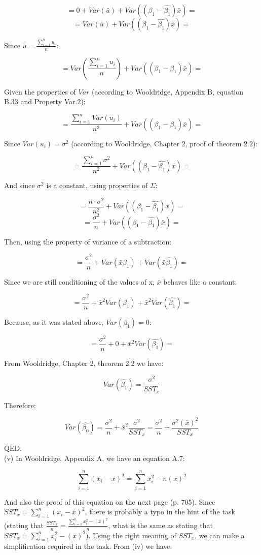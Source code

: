 \documentclass{article}
\begin{document}
$$= 0 + Var(\bar{u}) + Var((\beta_1 - \hat{\beta_1})\bar{x})=$$
$$= Var(\bar{u}) + Var((\beta_1 - \hat{\beta_1})\bar{x})=$$

Since $\bar{u} = \frac{\sum_{i=1}^{n} u_i}{n}$:

$$= Var(\frac{\sum_{i=1}^{n} u_i}{n}) + Var((\beta_1 - \hat{\beta_1})\bar{x})=$$

Given the properties of $Var$ (according to Wooldridge, Appendix B, equation B.33 and Property Var.2):

$$= \frac{\sum_{i=1}^{n} Var(u_i)}{n^2} + Var((\beta_1 - \hat{\beta_1})\bar{x})=$$
 
Since $Var(u_i) = \sigma^2$ (according to Wooldridge, Chapter 2, proof of theorem 2.2):

$$= \frac{\sum_{i=1}^{n} \sigma^2}{n^2} + Var((\beta_1 - \hat{\beta_1})\bar{x})=$$

And since $\sigma^2$ is a constant, using properties of $\Sigma$:

$$= \frac{n \cdot \sigma^2}{n^2} + Var((\beta_1 - \hat{\beta_1})\bar{x})=$$
$$= \frac{\sigma^2}{n} + Var((\beta_1 - \hat{\beta_1})\bar{x})=$$

Then, using the property of variance of a subtraction:

$$= \frac{\sigma^2}{n} + Var(\bar{x}\beta_1) + Var(\bar{x}\hat{\beta_1})=$$

Since we are still conditioning of the values of x, $\bar{x}$ behaves like a constant:

$$=\frac{\sigma^2}{n} + \bar{x}^2Var(\beta_1) + \bar{x}^2Var(\hat{\beta_1})=$$

Because, as it was stated above, $Var(\beta_1)=0$:

$$=\frac{\sigma^2}{n} + 0 + \bar{x}^2Var(\hat{\beta_1})=$$

From Wooldridge, Chapter 2, theorem 2.2 we have:

$$Var(\hat{\beta_1}) = \frac{\sigma^2}{SST_x}$$

Therefore:

$$Var(\hat{\beta_0})=\frac{\sigma^2}{n} + \bar{x}^2\frac{\sigma^2}{SST_x}=\frac{\sigma^2}{n} + \frac{\sigma^2 (\bar{x})^2}{SST_x}$$

QED.
\\

(v) In Wooldridge, Appendix A, we have an equation A.7:

$$\sum_{i=1}^{n} (x_i - \bar{x})^2 = \sum_{i=1}^{n} x_i^2 - n(\bar{x})^2$$

And also the proof of this equation on the next page (p. 705). Since $SST_x = \sum_{i=1}^{n} (x_i - \bar{x})^2$, there is probably a typo in the hint of the task (stating that $\frac{SST_x}{n} = \frac{\sum_{i=1}^{n} x_i^2 - (\bar{x})^2}{n}$, what is the same as stating that $SST_x = \sum_{i=1}^{n} x_i^2 - (\bar{x})^2$). Using the right meaning of $SST_x$, we can make a simplification required in the task. From (iv) we have:
\end{document}
